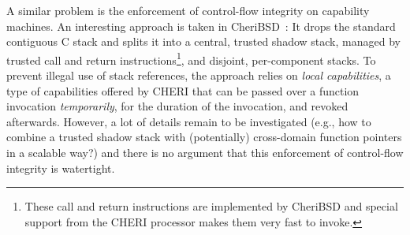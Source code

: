 \documentclass[compsoc,conference,letterpaper,fleqn]{IEEEtran}
\begin{document}
A similar problem is the enforcement of control-flow integrity on capability
machines. An interesting approach is taken in
CheriBSD~\citep{Watson2015Cheri}: It drops the standard
contiguous C stack and splits it into a central, trusted shadow stack, managed by
trusted call and return instructions\footnote{These call and return instructions
  are implemented by CheriBSD and special support from the CHERI processor makes
  them very fast to invoke.}, and disjoint, per-component
stacks. To prevent illegal use of stack references,
the approach relies on \emph{local capabilities}, a type of capabilities offered
by CHERI that can be passed over a function invocation \emph{temporarily}, for
the duration of the invocation, and revoked afterwards. However, a lot of
details remain to be investigated (e.g., how to combine a trusted shadow stack with
(potentially) cross-domain function pointers in a scalable way?) and there is no
argument that this enforcement of control-flow integrity is watertight.
\end{document}
